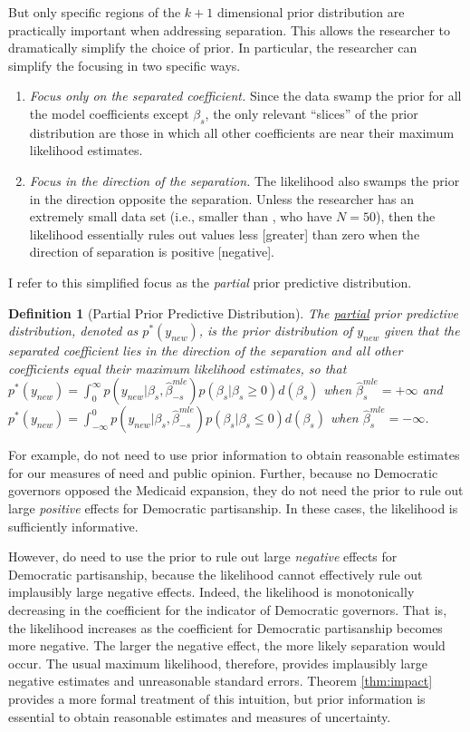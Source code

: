 \documentclass[12pt]{article}
\newtheorem{defn}{Definition}
\begin{document}
But only specific regions of the $k + 1$ dimensional prior distribution are practically important when addressing separation. 
This allows the researcher to dramatically simplify the choice of prior. 
In particular, the researcher can simplify the focusing in two specific ways.
\begin{enumerate}
\item \emph{Focus only on the separated coefficient.} 
Since the data swamp the prior for all the model coefficients except $\beta_s$, the only relevant ``slices'' of the prior distribution are those in which all other coefficients are near their maximum likelihood estimates.
\item \emph{Focus in the direction of the separation.} 
The likelihood also swamps the prior in the direction opposite the separation. 
Unless the researcher has an extremely small data set (i.e., smaller than \cite{BarrilleauxRainey2014}, who have $N = 50$), then the likelihood essentially rules out values less [greater] than zero when the direction of separation is positive [negative].
\end{enumerate}

I refer to this simplified focus as the \emph{partial} prior predictive distribution.

\begin{defn}[Partial Prior Predictive Distribution]\label{def:pppd} 
The \underline{partial} prior predictive distribution, denoted as $p^*(y_{new})$, is the prior distribution of $y_{new}$ given that the separated coefficient lies in the direction of the separation and all other coefficients equal their maximum likelihood estimates, so that $p^*(y_{new}) = \int_{0}^{\infty} p(y_{new} | \beta_s, \hat{\beta}_{-s}^{mle})p(\beta_s | \beta_s \geq 0)d(\beta_s)$ when $\hat{\beta}_{s}^{mle} = +\infty$ and $p^*(y_{new}) = \int_{-\infty}^{0} p(y_{new} | \beta_s, \hat{\beta}_{-s}^{mle})p(\beta_s | \beta_s \leq 0)d(\beta_s)$ when $\hat{\beta}_{s}^{mle} = -\infty$.
\end{defn}

For example, \cite{BarrilleauxRainey2014} do not need to use prior information to obtain reasonable estimates for our measures of need and public opinion. 
Further, because no Democratic governors opposed the Medicaid expansion, they do not need the prior to rule out large \textit{positive} effects for Democratic partisanship. 
In these cases, the likelihood is sufficiently informative. 

However, \cite{BarrilleauxRainey2014} do need to use the prior to rule out large \textit{negative} effects for Democratic partisanship, because the likelihood cannot effectively rule out implausibly large negative effects. 
Indeed, the likelihood is monotonically decreasing in the coefficient for the indicator of Democratic governors. 
That is, the likelihood increases as the coefficient for Democratic partisanship becomes more negative. 
The larger the negative effect, the more likely separation would occur. 
The usual maximum likelihood, therefore, provides implausibly large negative estimates and unreasonable standard errors. 
Theorem \ref{thm:impact} provides a more formal treatment of this intuition, but prior information is essential to obtain reasonable estimates and measures of uncertainty. 
\end{document}
